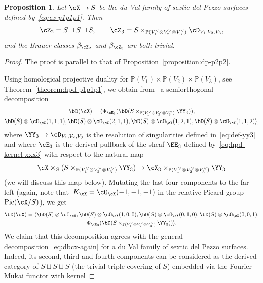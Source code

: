 \documentclass[11pt]{amsart}
\renewcommand{\P}{{\mathbb{P}}}
\DeclareMathOperator{\Pic}{\mathrm{Pic}}
\theoremstyle{plain}
\newtheorem{proposition}[theorem]{Proposition}
\theoremstyle{definition}
\theoremstyle{remark}
\begin{document}
\begin{proposition}\label{proposition:dp-p1p1p1}
Let $\cX \to S$ be the du Val family of sextic del Pezzo surfaces defined by~\textup{\eqref{eq:cx-p1p1p1}}. 
Then 
\begin{equation*}
\cZ_2 = S \sqcup S \sqcup S,
\qquad 
\cZ_3 = S \times_{\P(V_1^\vee \otimes V_2^\vee \otimes V_3^\vee)} {\cD_{V_1,V_2,V_3}},
\end{equation*}
and the Brauer classes $\beta_{\cZ_2}$ and $\beta_{\cZ_3}$ are both trivial.
\end{proposition}
\begin{proof}
The proof is parallel to that of Proposition~\ref{proposition:dp-p2p2}.

Using homological projective duality for $\P(V_1) \times \P(V_2) \times \P(V_3)$, see Theorem~\ref{theorem:hpd-p1p1p1}, 
we obtain from~\cite[Theorem~6.27]{kuznetsov2007hpd} a semiorthogonal decomposition
\begin{multline*}
\bD(\cX) = \langle \Phi_{\cE_3}(\bD(S \times_{\P(V_1^\vee \otimes V_2^\vee \otimes V_3^\vee)} \YY_3)), \\
\bD(S) \otimes \cO_\cX(1,1,1), \bD(S) \otimes \cO_\cX(2,1,1), \bD(S) \otimes \cO_\cX(1,2,1), \bD(S) \otimes \cO_\cX(1,1,2) \rangle,
\end{multline*}
where $\YY_3 \to \cD_{V_1,V_2,V_3}$ is the resolution of singularities defined in~\eqref{eq:def-yy3} and
where $\cE_3$ is the derived pullback of the sheaf $\EE_3$ defined by~\eqref{eq:hpd-kernel-xxx3} with respect to the natural map 
\begin{equation}\label{eq:map-cx3}
\cX \times_S (S \times_{\P(V_1^\vee \otimes V_2^\vee \otimes V_3^\vee)} \YY_3) \to \cX_3 \times_{\P(V_1^\vee \otimes V_2^\vee \otimes V_3^\vee)} \YY_3
\end{equation} 
(we will discuss this map below).
Mutating the last four components to the far left 
(again, note that~\mbox{$K_\cX = \cO_\cX(-1,-1,-1)$} in the relative Picard group~$\Pic(\cX/S)$), we get
\begin{multline}
\bD(\cX) = \langle \bD(S) \otimes \cO_\cX, \bD(S) \otimes \cO_\cX(1,0,0), \bD(S) \otimes \cO_\cX(0,1,0), \bD(S) \otimes \cO_\cX(0,0,1), \\
\Phi_{\cE_3}(\bD(S \times_{\P(V_1^\vee \otimes V_2^\vee \otimes V_3^\vee)} \YY_3)) \rangle.
\end{multline}
We claim that this decomposition agrees with the general decomposition~\eqref{eq:dbcx-again} for a du Val family of sextic del Pezzo surfaces.
Indeed, its second, third and fourth components can be considered as the derived category of $S \sqcup S \sqcup S$ (the trivial triple covering of $S$) embedded via the Fourier--Mukai functor with kernel

\end{proof}
\end{document}
